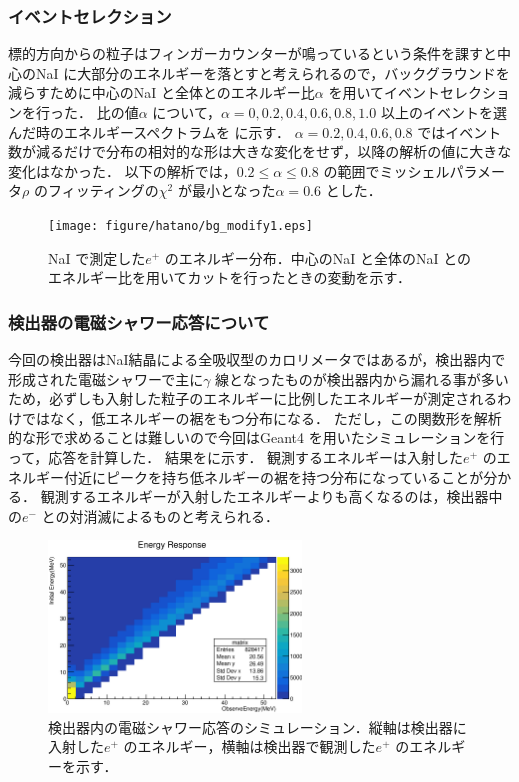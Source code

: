 \subsubsection{イベントセレクション}
標的方向からの粒子はフィンガーカウンターが鳴っているという条件を課すと中心のNaI に大部分のエネルギーを落とすと考えられるので，バックグラウンドを減らすために中心のNaI と全体とのエネルギー比$\alpha$ を用いてイベントセレクションを行った．
比の値$\alpha$ について，$\alpha=0,0.2,0.4,0.6,0.8,1.0$ 以上のイベントを選んだ時のエネルギースペクトラムを に示す．
$\alpha=0.2,0.4,0.6,0.8$ ではイベント数が減るだけで分布の相対的な形は大きな変化をせず，以降の解析の値に大きな変化はなかった．
以下の解析では，$0.2\leq\alpha\leq0.8$ の範囲でミッシェルパラメータ$\rho$ のフィッティングの$\chi^2$ が最小となった$\alpha=0.6$ とした．
\begin{figure}[hbt]
\centering
\texttt{[image: figure/hatano/bg\_modify1.eps]}
\caption{NaI で測定した$e^+$ のエネルギー分布．中心のNaI と全体のNaI とのエネルギー比を用いてカットを行ったときの変動を示す．}
\label{hatano_fig:bg}
\end{figure}

\subsubsection{検出器の電磁シャワー応答について}
今回の検出器はNaI結晶による全吸収型のカロリメータではあるが，検出器内で形成された電磁シャワーで主に$\gamma$ 線となったものが検出器内から漏れる事が多いため，必ずしも入射した粒子のエネルギーに比例したエネルギーが測定されるわけではなく，低エネルギーの裾をもつ分布になる．
ただし，この関数形を解析的な形で求めることは難しいので今回はGeant4 を用いたシミュレーションを行って，応答を計算した．
結果をに示す．
観測するエネルギーは入射した$e^+$ のエネルギー付近にピークを持ち低ネルギーの裾を持つ分布になっていることが分かる．
観測するエネルギーが入射したエネルギーよりも高くなるのは，検出器中の$e^-$ との対消滅によるものと考えられる．

\begin{figure}[hbt]
\centering
\includegraphics[width=0.6\textwidth]{figure/hatano/response.eps}
\caption{検出器内の電磁シャワー応答のシミュレーション．縦軸は検出器に入射した$e^+$ のエネルギー，横軸は検出器で観測した$e^+$ のエネルギーを示す．}
\label{hatano_fig:response}
\end{figure}

